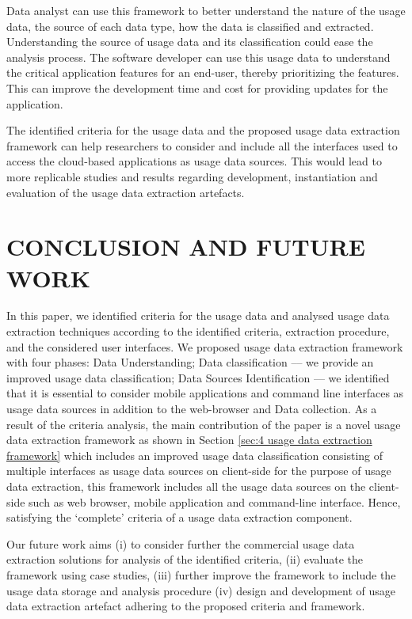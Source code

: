 \documentclass[a4paper,twoside]{article}
\begin{document}
Data analyst can use this framework to better understand the nature of the usage data, the source of each data type, how the data is classified and extracted. Understanding the source of usage data and its classification could ease the analysis process. 
The software developer can use this usage data to understand the critical application features for an end-user, thereby prioritizing the features. This can improve the development time and cost for providing updates for the application.

The identified criteria for the usage data and the proposed usage data extraction framework can help researchers to consider and include all the interfaces used to access the cloud-based applications as usage data sources. This would lead to more replicable studies and results regarding development, instantiation and evaluation of the usage data extraction artefacts. 

\section{CONCLUSION AND FUTURE WORK}
\label{sec:5 conclusion and future work}

\noindent In this paper, we identified criteria for the usage data and analysed usage data extraction techniques according to the identified criteria, extraction procedure, and the considered user interfaces. We proposed usage data extraction framework with four phases: Data Understanding; Data classification --– we provide an improved usage data classification; Data Sources Identification –-- we identified that it is essential to consider mobile applications and command line interfaces as usage data sources in addition to the web-browser and Data collection. As a result of the criteria analysis, the main contribution of the paper is a novel usage data extraction framework as shown in Section \ref{sec:4 usage data extraction framework} which includes an improved usage data classification consisting of multiple interfaces as usage data sources on client-side for the purpose of usage data extraction, this framework includes all the usage data sources on the client-side such as web browser, mobile application and command-line interface. Hence, satisfying the ‘complete’ criteria of a usage data extraction component.

Our future work aims (i) to consider further the commercial usage data extraction solutions for analysis of the identified criteria, (ii) evaluate the framework using case studies, (iii) further improve the framework to include the usage data storage and analysis procedure (iv) design and development of usage data extraction artefact adhering to the proposed criteria and framework.
\end{document}
